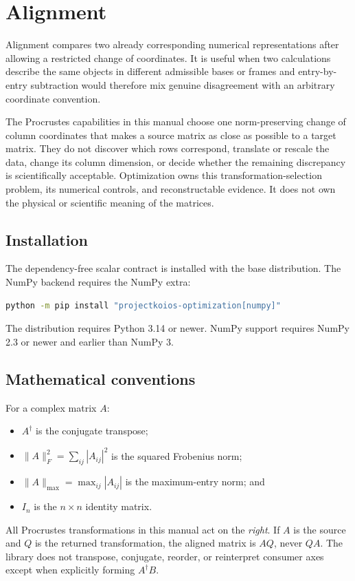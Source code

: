\chapter{Alignment}

Alignment compares two already corresponding numerical representations after allowing a
restricted change of coordinates. It is useful when two calculations describe the same
objects in different admissible bases or frames and entry-by-entry subtraction would
therefore mix genuine disagreement with an arbitrary coordinate convention.

The Procrustes capabilities in this manual choose one norm-preserving change of column
coordinates that makes a source matrix as close as possible to a target matrix. They do
not discover which rows correspond, translate or rescale the data, change its column
dimension, or decide whether the remaining discrepancy is scientifically acceptable.
Optimization owns this transformation-selection problem, its numerical controls, and
reconstructable evidence. It does not own the physical or scientific meaning of the
matrices.

\section{Installation}
The dependency-free scalar contract is installed with the base distribution. The NumPy
backend requires the NumPy extra:
\begin{lstlisting}[language=bash]
python -m pip install "projectkoios-optimization[numpy]"
\end{lstlisting}
The distribution requires Python 3.14 or newer. NumPy support requires NumPy 2.3 or
newer and earlier than NumPy 3.

\section{Mathematical conventions}
For a complex matrix $A$:
\begin{itemize}
  \item $A^\dagger$ is the conjugate transpose;
  \item $\lVert A\rVert_F^2=\sum_{ij}|A_{ij}|^2$ is the squared Frobenius norm;
  \item $\lVert A\rVert_{\max}=\max_{ij}|A_{ij}|$ is the maximum-entry norm; and
  \item $I_n$ is the $n\times n$ identity matrix.
\end{itemize}
All Procrustes transformations in this manual act on the \emph{right}. If $A$ is the
source and $Q$ is the returned transformation, the aligned matrix is $AQ$, never $QA$.
The library does not transpose, conjugate, reorder, or reinterpret consumer axes except
when explicitly forming $A^\dagger B$.

